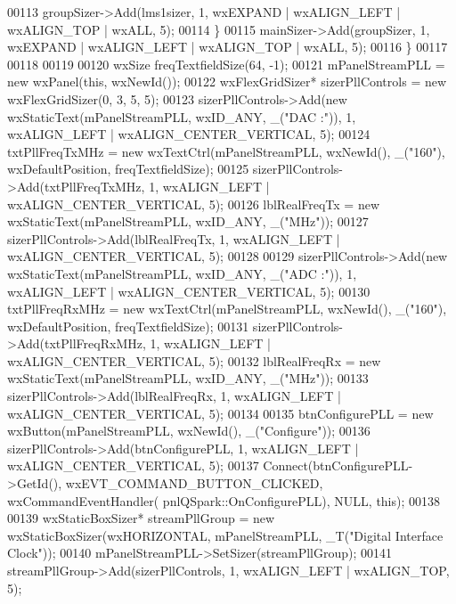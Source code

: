 \begin{DoxyCode}
00113             groupSizer->Add(lms1sizer, 1, wxEXPAND | wxALIGN\_LEFT | wxALIGN\_TOP |  wxALL, 5);
00114         \}
00115         mainSizer->Add(groupSizer, 1, wxEXPAND | wxALIGN\_LEFT | wxALIGN\_TOP | wxALL, 5);
00116     \}
00117 
00118 
00119 
00120     wxSize freqTextfieldSize(64, -1);
00121     mPanelStreamPLL = \textcolor{keyword}{new} wxPanel(\textcolor{keyword}{this}, wxNewId());
00122     wxFlexGridSizer* sizerPllControls = \textcolor{keyword}{new} wxFlexGridSizer(0, 3, 5, 5);
00123     sizerPllControls->Add(\textcolor{keyword}{new} wxStaticText(mPanelStreamPLL, wxID\_ANY, \_(\textcolor{stringliteral}{"DAC :"})), 1, wxALIGN\_LEFT | 
      wxALIGN\_CENTER\_VERTICAL, 5);
00124     txtPllFreqTxMHz = \textcolor{keyword}{new} wxTextCtrl(mPanelStreamPLL, wxNewId(), \_(\textcolor{stringliteral}{"160"}), wxDefaultPosition, 
      freqTextfieldSize);
00125     sizerPllControls->Add(txtPllFreqTxMHz, 1, wxALIGN\_LEFT | wxALIGN\_CENTER\_VERTICAL, 5);
00126     lblRealFreqTx = \textcolor{keyword}{new} wxStaticText(mPanelStreamPLL, wxID\_ANY, \_(\textcolor{stringliteral}{"MHz"}));
00127     sizerPllControls->Add(lblRealFreqTx, 1, wxALIGN\_LEFT | wxALIGN\_CENTER\_VERTICAL, 5);
00128 
00129     sizerPllControls->Add(\textcolor{keyword}{new} wxStaticText(mPanelStreamPLL, wxID\_ANY, \_(\textcolor{stringliteral}{"ADC :"})), 1, wxALIGN\_LEFT | 
      wxALIGN\_CENTER\_VERTICAL, 5);
00130     txtPllFreqRxMHz = \textcolor{keyword}{new} wxTextCtrl(mPanelStreamPLL, wxNewId(), \_(\textcolor{stringliteral}{"160"}), wxDefaultPosition, 
      freqTextfieldSize);
00131     sizerPllControls->Add(txtPllFreqRxMHz, 1, wxALIGN\_LEFT | wxALIGN\_CENTER\_VERTICAL, 5);
00132     lblRealFreqRx = \textcolor{keyword}{new} wxStaticText(mPanelStreamPLL, wxID\_ANY, \_(\textcolor{stringliteral}{"MHz"}));
00133     sizerPllControls->Add(lblRealFreqRx, 1, wxALIGN\_LEFT | wxALIGN\_CENTER\_VERTICAL, 5);
00134 
00135     btnConfigurePLL = \textcolor{keyword}{new} wxButton(mPanelStreamPLL, wxNewId(), \_(\textcolor{stringliteral}{"Configure"}));
00136     sizerPllControls->Add(btnConfigurePLL, 1, wxALIGN\_LEFT | wxALIGN\_CENTER\_VERTICAL, 5);
00137     Connect(btnConfigurePLL->GetId(), wxEVT\_COMMAND\_BUTTON\_CLICKED, wxCommandEventHandler(
      pnlQSpark::OnConfigurePLL), NULL, \textcolor{keyword}{this});
00138 
00139     wxStaticBoxSizer* streamPllGroup = \textcolor{keyword}{new} wxStaticBoxSizer(wxHORIZONTAL, 
      mPanelStreamPLL, _T(\textcolor{stringliteral}{"Digital Interface Clock"}));
00140     mPanelStreamPLL->SetSizer(streamPllGroup);
00141     streamPllGroup->Add(sizerPllControls, 1, wxALIGN\_LEFT | wxALIGN\_TOP, 5);

\end{DoxyCode}

